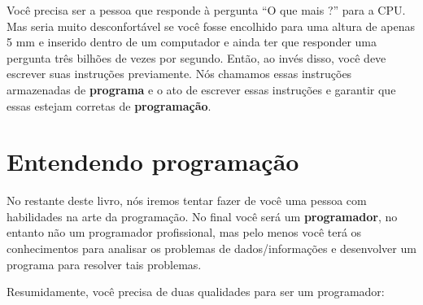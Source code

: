 Você precisa ser a pessoa que responde à pergunta ``O que mais ?''
para a CPU. Mas seria muito desconfortável se você fosse encolhido
para uma altura de apenas 5 mm e inserido dentro de um computador
e ainda ter que responder uma pergunta três bilhões de vezes por segundo.
Então, ao invés disso, você deve escrever suas instruções previamente.
Nós chamamos essas instruções armazenadas de {\bf programa} e o
ato de escrever essas instruções e garantir que essas estejam corretas de {\bf programação}.
%
\section{Entendendo programação}
%

No restante deste livro, nós iremos tentar fazer de você uma pessoa
com habilidades na arte da programação. No final você será um
{\bf programador}, no entanto não um programador profissional, mas
pelo menos você terá os conhecimentos para analisar os problemas
de dados/informações e desenvolver um programa para resolver tais
problemas.
%

%

Resumidamente, você precisa de duas qualidades para ser um programador:
%

